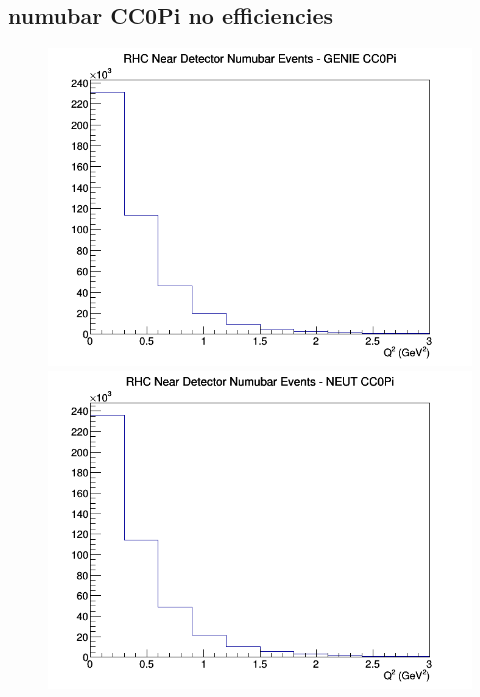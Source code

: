 \subsection{numubar CC0Pi no efficiencies}
\begin{figure}[h]
\includegraphics[width=\linewidth]{Q2/nominal/CC0Pi_RHC_ND_numubar_Q2_GENIE.png}
\endminipage
{}
\includegraphics[width=\linewidth]{Q2/nominal/CC0Pi_RHC_ND_numubar_Q2_NEUT.png}
\endminipage
{}

\end{figure}
